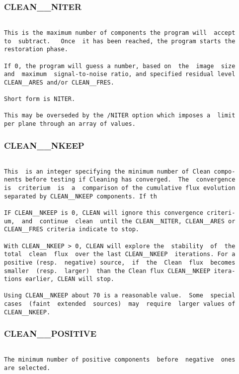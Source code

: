 \subsubsection{CLEAN\_\_NITER}
\begin{verbatim}

This is the maximum number of components the program will  accept
to  subtract.   Once  it has been reached, the program starts the
restoration phase.

If 0, the program will guess a number, based on  the  image  size
and  maximum  signal-to-noise ratio, and specified residual level
CLEAN__ARES and/or CLEAN__FRES.

Short form is NITER.

This may be overseded by the /NITER option which imposes a  limit
per plane through an array of values.

\end{verbatim}
\subsubsection{CLEAN\_\_NKEEP}
\begin{verbatim}

This  is an integer specifying the minimum number of Clean compo-
nents before testing if Cleaning has converged.  The  convergence
is  criterium  is  a  comparison of the cumulative flux evolution
separated by CLEAN__NKEEP components. If th

IF CLEAN__NKEEP is 0, CLEAN will ignore this convergence criteri-
um,  and  continue  clean  until the CLEAN__NITER, CLEAN__ARES or
CLEAN__FRES criteria indicate to stop.

With CLEAN__NKEEP > 0, CLEAN will explore the  stability  of  the
total  clean  flux  over the last CLEAN__NKEEP  iterations. For a
positive (resp.  negative) source,  if  the  Clean  flux  becomes
smaller  (resp.  larger)  than the Clean flux CLEAN__NKEEP itera-
tions earlier, CLEAN will stop.

Using CLEAN__NKEEP about 70 is a reasonable value.  Some  special
cases  (faint  extended  sources)  may  require  larger values of
CLEAN__NKEEP.

\end{verbatim}
\subsubsection{CLEAN\_\_POSITIVE}
\begin{verbatim}

The minimum number of positive components  before  negative  ones
are selected.

\end{verbatim}
